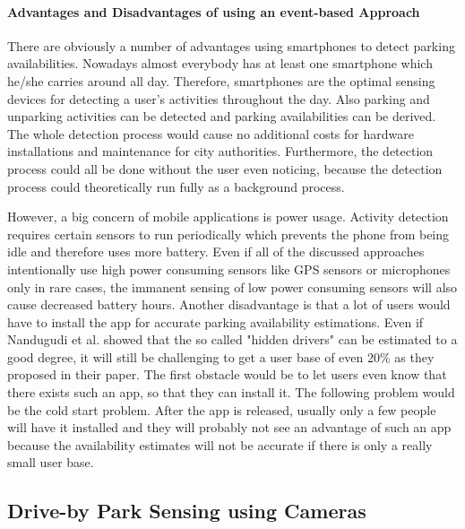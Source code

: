 \paragraph{Advantages and Disadvantages of using an event-based Approach}

There are obviously a number of advantages using smartphones to detect parking availabilities. Nowadays almost everybody has at least one smartphone which he/she carries around all day. Therefore, smartphones are the optimal sensing devices for detecting a user's activities throughout the day. Also parking and unparking activities can be detected and parking availabilities can be derived. The whole detection process would cause no additional costs for hardware installations and maintenance for city authorities. Furthermore, the detection process could all be done without the user even noticing, because the detection process could theoretically run fully as a background process. 

However, a big concern of mobile applications is power usage. Activity detection requires certain sensors to run periodically which prevents the phone from being idle and therefore uses more battery. Even if all of the discussed approaches intentionally use high power consuming sensors like GPS sensors or microphones only in rare cases, the immanent sensing of low power consuming sensors will also cause decreased battery hours. Another disadvantage is that a lot of users would have to install the app for accurate parking availability estimations. Even if Nandugudi et al. \cite{Nandugudi:2014:PPP:2632048.2632098} showed that the so called "hidden drivers" can be estimated to a good degree, it will still be challenging to get a user base of even 20\% as they proposed in their paper. The first obstacle would be to let users even know that there exists such an app, so that they can install it. The following problem would be the cold start problem. After the app is released, usually only a few people will have it installed and they will probably not see an advantage of such an app because the availability estimates will not be accurate if there is only a really small user base. 






\subsection{Drive-by Park Sensing using Cameras}
\label{sec:related_driveby_park_sensing_cameras}
 
